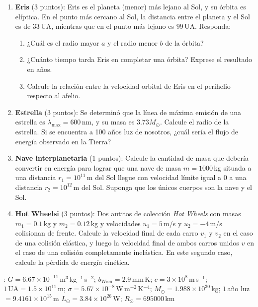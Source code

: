 \documentclass[a4paper,12pt]{article}
\begin{document}
\begin{enumerate}
	\item{\bf{Eris}} (3 puntos):
		Eris es el planeta (menor) más lejano al Sol, y su órbita es elíptica.
		En el punto más cercano al Sol, la distancia entre el planeta y el Sol
		es de $33$\,UA, mientras que en el punto más lejano es $99$\,UA.
		Responda:
		\begin{enumerate}
			\item ¿Cuál es el radio mayor $a$ y el radio menor $b$ de la
				órbita?
			\item ¿Cuánto tiempo tarda Eris en completar una órbita? Exprese
				el resultado en años.
			\item Calcule la relación entre la velocidad orbital de Eris en el
				perihelio respecto al afelio. 
		\end{enumerate}
	\item{\bf{Estrella}} (3 puntos):
		Se determinó que la línea de máxima emisión de una estrella es
		$\lambda_{\max}=600$\,nm, y su masa es $3.73 M_\odot$. Calcule el
		radio de la estrella. Si se encuentra a 100 años luz de nosotros,
		¿cuál sería el flujo de energía observado en la Tierra?
	\item {\bf{Nave interplanetaria}} (1 puntos):
		Calcule la cantidad de masa que debería convertir en energía para
		lograr que una nave de masa $m=1000$\,kg situada a una distancia
		$r_1=10^{11}$\,m del Sol llegue con velocidad límite igual a 0 a una
		distancia $r_2=10^{12}$\,m del Sol. Suponga que los únicos cuerpos son
		la nave y el Sol.
	\item {\bf{Hot Wheelsi}} (3 puntos):
		Dos autitos de colección {\emph{Hot Wheels}} con masas $m_1=0.1$\,kg y
		$m_2=0.12$\,kg y velocidades $u_1=5$\,m/s y $u_2=-4$\,m/s colisionan
		de frente. Calcule la velocidad final de cada carro $v_1$ y $v_2$ en
		el caso de una colisión elástica, y luego la velocidad final de ambos
		carros unidos $v$ en el caso de una colisión completamente inelástica.
		En este segundo caso, calcule la pérdida de energía cinética.
\end{enumerate}

: $G = 6.67 \times 10^{-11}$\,m$^3$\,kg$^{-1}$\,s$^{-2}$;
$b_{\mathrm{Wien}} = 2.9 $\,mm\,K;
$c = 3 \times 10^{8}$\,m\,s$^{-1}$;
$1\mathrm{\,UA} = 1.5 \times 10^{11}$\,m;
$\sigma = 5.67 \times 10^{-8}$\,W\,m$^{-2}$\,K$^{-4}$;
$M_\odot = 1.988\times10^{30}$\,kg;
$1$\,año luz$=9.4161\times 10^{15}$\,m
$L_\odot = 3.84\times10^{26}$\,W;
$R_\odot=695000$\,km
\end{document}

